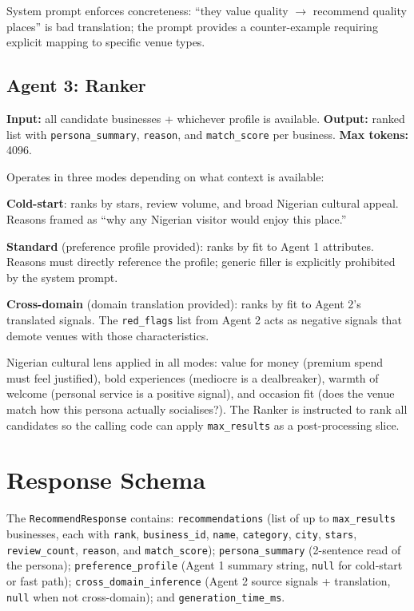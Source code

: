 \documentclass[11pt]{article}
\begin{document}
System prompt enforces concreteness: ``they value quality $\rightarrow$ recommend quality places'' is bad translation; the prompt provides a counter-example requiring explicit mapping to specific venue types.

\subsection{Agent 3: Ranker}

\textbf{Input:} all candidate businesses + whichever profile is available. \textbf{Output:} ranked list with \texttt{persona\_summary}, \texttt{reason}, and \texttt{match\_score} per business. \textbf{Max tokens:} 4096.

Operates in three modes depending on what context is available:

\textbf{Cold-start}: ranks by stars, review volume, and broad Nigerian cultural appeal. Reasons framed as ``why any Nigerian visitor would enjoy this place.''

\textbf{Standard} (preference profile provided): ranks by fit to Agent 1 attributes. Reasons must directly reference the profile; generic filler is explicitly prohibited by the system prompt.

\textbf{Cross-domain} (domain translation provided): ranks by fit to Agent 2's translated signals. The \texttt{red\_flags} list from Agent 2 acts as negative signals that demote venues with those characteristics.

Nigerian cultural lens applied in all modes: value for money (premium spend must feel justified), bold experiences (mediocre is a dealbreaker), warmth of welcome (personal service is a positive signal), and occasion fit (does the venue match how this persona actually socialises?). The Ranker is instructed to rank all candidates so the calling code can apply \texttt{max\_results} as a post-processing slice.

\section{Response Schema}

The \texttt{RecommendResponse} contains: \texttt{recommendations} (list of up to \texttt{max\_results} businesses, each with \texttt{rank}, \texttt{business\_id}, \texttt{name}, \texttt{category}, \texttt{city}, \texttt{stars}, \texttt{review\_count}, \texttt{reason}, and \texttt{match\_score}); \texttt{persona\_summary} (2-sentence read of the persona); \texttt{preference\_profile} (Agent 1 summary string, \texttt{null} for cold-start or fast path); \texttt{cross\_domain\_inference} (Agent 2 source signals + translation, \texttt{null} when not cross-domain); and \texttt{generation\_time\_ms}.
\end{document}
